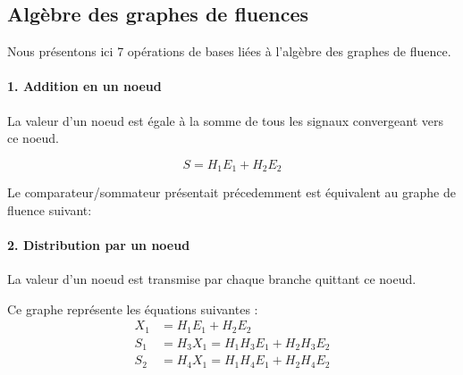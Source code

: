 \subsection{Algèbre des graphes de fluences}
Nous présentons ici 7 opérations de bases liées à l'algèbre des 
graphes de fluence.

\paragraph{1. Addition en un noeud}

La valeur d'un noeud est égale à la somme de tous les signaux convergeant 
vers ce noeud.
\begin{center}
    
\end{center}
$$
S=H_1E_1+H_2E_2
$$

Le comparateur/sommateur présentait précedemment est équivalent au graphe 
de fluence suivant:

\begin{center}
    
\end{center}

\paragraph{2. Distribution par un noeud}

La valeur d'un noeud est transmise par chaque branche quittant ce noeud.
\begin{center}
    
\end{center}

Ce graphe représente les équations suivantes :
\begin{align*}
    X_1&=H_1E_1+H_2E_2\\
    S_1&=H_3X_1=H_1H_3E_1+H_2H_3E_2\\
    S_2&=H_4X_1=H_1H_4E_1+H_2H_4E_2
\end{align*}



